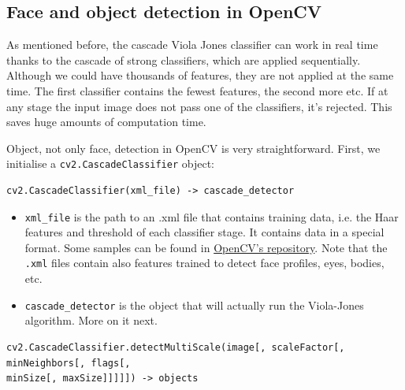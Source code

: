 \documentclass[a4paper]{article}
\begin{document}
\subsection{Face and object detection in OpenCV}

As mentioned before, the cascade Viola Jones classifier can work in real time thanks to the cascade of strong classifiers, which are applied sequentially. Although we could have thousands of features, they are not applied at the same time. The first classifier contains the fewest features, the second more etc. If at any stage the input image does not pass one of the classifiers, it's rejected. This saves huge amounts of computation time.

Object, not only face, detection in OpenCV is very straightforward. First, we initialise a \texttt{cv2.CascadeClassifier} object:
\begin{verbatim}
cv2.CascadeClassifier(xml_file) -> cascade_detector
\end{verbatim}
\begin{itemize}
    \item \texttt{xml_file} is the path to an .xml file that contains training data, i.e. the Haar features and threshold of each classifier stage. It contains data in a special format. Some samples can be found in \href{https://github.com/opencv/opencv/tree/master/data/haarcascades}{OpenCV's repository}. Note that the \texttt{.xml} files contain also features trained to detect face profiles, eyes, bodies, etc.
    \item \texttt{cascade_detector} is the object that will actually run the Viola-Jones algorithm. More on it next.
\end{itemize}
\begin{verbatim}
cv2.CascadeClassifier.detectMultiScale(image[, scaleFactor[, minNeighbors[, flags[,
minSize[, maxSize]]]]]) -> objects
\end{verbatim}
\end{document}
